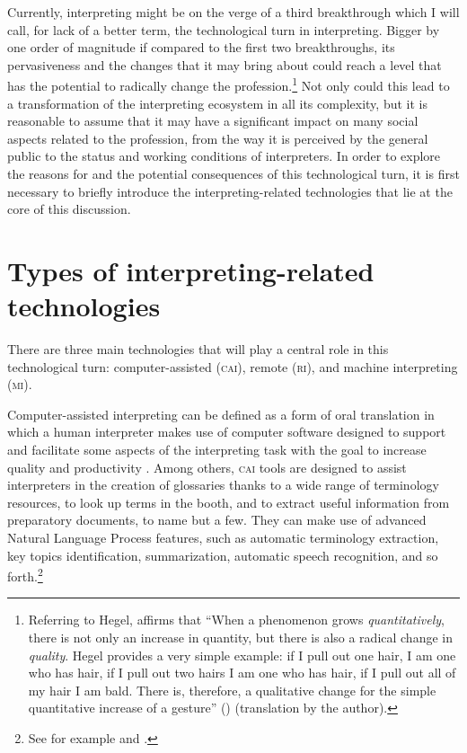 \documentclass[output=paper]{langsci/langscibook}
\begin{document}
Currently, interpreting might be on the verge of a third breakthrough which I will call, for lack of a better term, the technological turn in interpreting. Bigger by one order of magnitude if compared to the first two breakthroughs, its pervasiveness and the changes that it may bring about could reach a level that has the potential to radically change the profession.\footnote{Referring to Hegel, \citeauthor{galimberti_i_2009} affirms that ``When a phenomenon grows \textit{quantitatively}, there is not only an increase in quantity, but there is also a radical change in \textit{quality}. Hegel provides a very simple example: if I pull out one hair, I am one who has hair, if I pull out two hairs I am one who has hair, if I pull out all of my hair I am bald. There is, therefore, a qualitative change for the simple quantitative increase of a gesture'' (\citeyear[215]{galimberti_i_2009}) (translation by the author).} Not only could this lead to a transformation of the interpreting ecosystem in all its complexity, but it is reasonable to assume that it may have a significant impact on many social aspects related to the profession, from the way it is perceived by the general public to the status and working conditions of interpreters. In order to explore the reasons for and the potential consequences of this technological turn, it is first necessary to briefly introduce the interpreting-related technologies that lie at the core of this discussion. 
 
\section{Types of interpreting-related technologies} 
There are three main technologies that will play a central role in this technological turn: computer-assisted (\textsc{cai}), remote (\textsc{ri}), and machine interpreting (\textsc{mi}). 
 
Computer-assisted interpreting can be defined as a form of oral translation in which a human interpreter makes use of computer software designed to support and facilitate some aspects of the interpreting task with the goal to increase quality and productivity \citep{Fantinuoli2018}. Among others, \textsc{cai} tools are designed to assist interpreters in the creation of glossaries thanks to a wide range of terminology resources, to look up terms in the booth, and to extract useful information from preparatory documents, to name but a few. They can make use of advanced Natural Language Process features, such as automatic terminology extraction, key topics identification, summarization, automatic speech recognition, and so forth.\footnote{See for example
\citet{Fantinuoli2017b}
and \citet{stewart_automatic_2018}.} 
 
\end{document}
